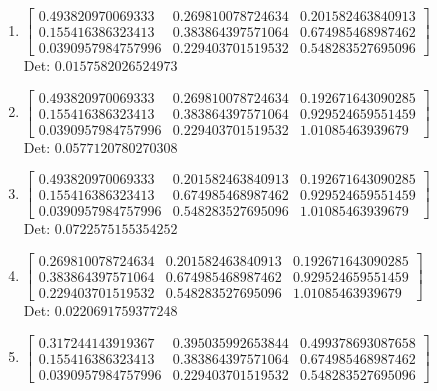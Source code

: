 \documentclass[12pt]{article}
\begin{document}
\begin{enumerate}
\item $\displaystyle \left[\begin{matrix}0.493820970069333 & 0.269810078724634 & 0.201582463840913\\0.155416386323413 & 0.383864397571064 & 0.674985468987462\\0.0390957984757996 & 0.229403701519532 & 0.548283527695096\end{matrix}\right]$\\

Det: $0.0157582026524973$\\

\item $\displaystyle \left[\begin{matrix}0.493820970069333 & 0.269810078724634 & 0.192671643090285\\0.155416386323413 & 0.383864397571064 & 0.929524659551459\\0.0390957984757996 & 0.229403701519532 & 1.01085463939679\end{matrix}\right]$\\

Det: $0.0577120780270308$\\

\item $\displaystyle \left[\begin{matrix}0.493820970069333 & 0.201582463840913 & 0.192671643090285\\0.155416386323413 & 0.674985468987462 & 0.929524659551459\\0.0390957984757996 & 0.548283527695096 & 1.01085463939679\end{matrix}\right]$\\

Det: $0.0722575155354252$\\

\item $\displaystyle \left[\begin{matrix}0.269810078724634 & 0.201582463840913 & 0.192671643090285\\0.383864397571064 & 0.674985468987462 & 0.929524659551459\\0.229403701519532 & 0.548283527695096 & 1.01085463939679\end{matrix}\right]$\\

Det: $0.0220691759377248$\\

\item $\displaystyle \left[\begin{matrix}0.317244143919367 & 0.395035992653844 & 0.499378693087658\\0.155416386323413 & 0.383864397571064 & 0.674985468987462\\0.0390957984757996 & 0.229403701519532 & 0.548283527695096\end{matrix}\right]$\\


\end{enumerate}
\end{document}
